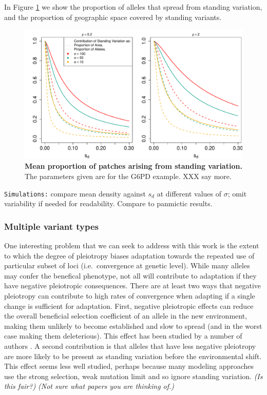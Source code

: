 \documentclass{article}
\newcommand{\gc}[1]{{\it\color{green}(#1)} }
\newcommand{\plr}[1]{{\it\color{blue}(#1)}}
\begin{document}
In Figure \ref{G6PD_standing_var_proportion} we show the proportion of
alleles that spread from standing variation, and the proportion of
geographic space covered by standing variants. 

\begin{figure}[ht]
\begin{center}
  \includegraphics[width=1.0\textwidth]{G6PD_standing_var_proportion}
\caption{ %
{\bf Mean proportion of patches arising from standing variation.} The parameters given are for the G6PD example.  XXX say more.
} \label{G6PD_standing_var_proportion}
\end{center}
\end{figure}


{\tt Simulations:} 
compare mean density against $s_d$ at different values of $\sigma$; 
omit variability if needed for readability. 
Compare to panmictic results.


\subsubsection{Multiple variant types}

One interesting problem that we can seek to address with this work is
the extent to which the degree of pleiotropy biases 
adaptation towards the repeated use of particular subset of loci
(i.e.\ convergence at genetic level). 
While many alleles may confer the benefical phenotype, 
not all will contribute to adaptation if they have negative pleiotropic consequences.
There are at least two ways that negative pleiotropy can contribute to high rates of convergence 
when adapting if a single change is sufficient for adaptation. 
First, negative pleiotropic effects can reduce 
the overall beneficial selection coefficient of an allele in the new environment,
making them unlikely to become established and slow to spread 
(and in the worst case making them deleterious). 
This effect has been studied by a number of authors \citep{}. 
A second contribution is that alleles that have
less negative pleiotropy are more likely to be present as standing variation 
before the environmental shift.
This effect seems less well studied, 
perhaps because many modeling approaches use the strong selection, weak mutation limit 
and so ignore standing variation. 
\gc{Is this fair?}
\plr{Not sure what papers you are thinking of.}
\end{document}

